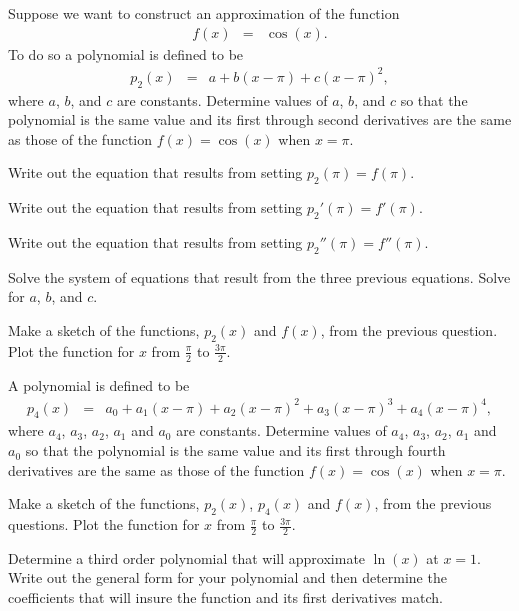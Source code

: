 \begin{problem}
\item Suppose we want to construct an approximation of the function
  \begin{eqnarray*}
    f(x) & = & \cos(x).
  \end{eqnarray*}
  To do so a polynomial is defined to be
  \begin{eqnarray*}
    p_2(x) & = & a + b (x-\pi) + c (x-\pi)^2 ,
  \end{eqnarray*}
  where $a$, $b$, and $c$ are constants.  Determine
  values of $a$, $b$,  and $c$ so that the
  polynomial is the same value and its first through second
  derivatives are the same as those of the function $f(x)=\cos(x)$ when
  $x=\pi$.
  \begin{subproblem}
  \item Write out the equation that results from setting $p_2(\pi)=f(\pi)$.
  \vfill
  \item Write out the equation that results from setting $p_2'(\pi)=f'(\pi)$.
  \vfill
  \item Write out the equation that results from setting $p_2''(\pi)=f''(\pi)$.
  \vfill
  \item Solve the system of equations that result from the three previous equations. Solve for $a$, $b$, and $c$.
  \vfill
  \vfill
  \end{subproblem}

\item Make a sketch of the functions, $p_2(x)$ and $f(x)$, from the
  previous question. Plot the function for $x$ from $\frac{\pi}{2}$ to
    $\frac{3\pi}{2}$.

  \vspace{5em}


  \clearpage

\item A polynomial is defined to be
  \begin{eqnarray*}
    p_4(x) & = &  a_0 + a_1 (x-\pi) +  a_2 (x-\pi)^2 +  a_3 (x-\pi)^3 +  a_4 (x-\pi)^4,
  \end{eqnarray*}
  where $a_4$, $a_3$, $a_2$, $a_1$ and $a_0$ are constants.  Determine
  values of $a_4$, $a_3$, $a_2$, $a_1$ and $a_0$ so that the
  polynomial is the same value and its first through fourth
  derivatives are the same as those of the function $f(x)=\cos(x)$ when
  $x=\pi$.

  \vfill

\item Make a sketch of the functions, $p_2(x)$, $p_4(x)$ and $f(x)$,
  from the previous questions. Plot the function for $x$ from $\frac{\pi}{2}$ to
    $\frac{3\pi}{2}$.

  \vspace{5em}

  \clearpage

\item Determine a third order polynomial that will approximate $\ln(x)$ at $x=1$.
    Write out the general form for your polynomial and then determine the coefficients that will insure the
    function and its first derivatives match.
  \vfill

\end{problem}


